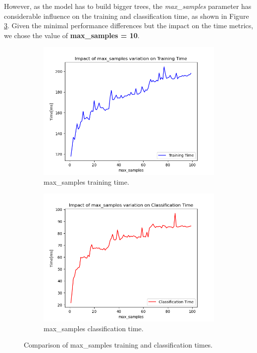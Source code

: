 \documentclass[futureinternet,article,submit,pdftex,moreauthors]{Definitions/mdpi}
\begin{document}
However, as the model has to build bigger trees, the \textit{max\_samples} parameter has considerable influence on the training and classification time, as shown in Figure \ref{fig:max_samples_time_comparison}.
Given the minimal performance differences but the impact on the time metrics, we chose the value of \textbf{max\_samples = 10}. 

\begin{figure}[H]
	\centering
	\begin{subfigure}{0.49\textwidth}
		\centering
		\includegraphics[width=\textwidth]{img/maxSamplesTrainingTime.png}
		\caption{max\_samples training time.}
		\label{fig:max_samples_training_time}
	\end{subfigure}
	\hfill
	\begin{subfigure}{0.49\textwidth}
		\centering
		\includegraphics[width=\textwidth]{img/maxSamplesClassificationTime.png}
		\caption{max\_samples classification time.}
		\label{fig:max_samples_classification_time}
	\end{subfigure}
	\caption{Comparison of max\_samples training and classification times.}
	\label{fig:max_samples_time_comparison}
\end{figure}
\end{document}
